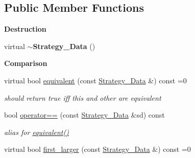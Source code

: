 \subsection*{Public Member Functions}
\begin{Indent}{\bf Destruction}\par
\begin{DoxyCompactItemize}
\item 
\hypertarget{class_strategy___data_a205c91d1a1daeb9cf9494d638c7ad04a}{}virtual {\bfseries $\sim$\+Strategy\+\_\+\+Data} ()\label{class_strategy___data_a205c91d1a1daeb9cf9494d638c7ad04a}

\end{DoxyCompactItemize}
\end{Indent}
\begin{Indent}{\bf Comparison}\par
\begin{DoxyCompactItemize}
\item 
\hypertarget{class_strategy___data_aa5c2a8e478379b335a47bd954d072b2f}{}virtual bool \hyperlink{class_strategy___data_aa5c2a8e478379b335a47bd954d072b2f}{equivalent} (const \hyperlink{class_strategy___data}{Strategy\+\_\+\+Data} \&) const  =0\label{class_strategy___data_aa5c2a8e478379b335a47bd954d072b2f}

\begin{DoxyCompactList}\small\item\em should return {\ttfamily true} iff {\ttfamily this} and other are equivalent \end{DoxyCompactList}\item 
\hypertarget{class_strategy___data_a3302c097b74709efb2237de9b2608eaa}{}bool \hyperlink{class_strategy___data_a3302c097b74709efb2237de9b2608eaa}{operator==} (const \hyperlink{class_strategy___data}{Strategy\+\_\+\+Data} \&sd) const \label{class_strategy___data_a3302c097b74709efb2237de9b2608eaa}

\begin{DoxyCompactList}\small\item\em alias for \hyperlink{class_strategy___data_aa5c2a8e478379b335a47bd954d072b2f}{equivalent()} \end{DoxyCompactList}\item 
\hypertarget{class_strategy___data_ad47f2b1b43b8730885577dadd98af591}{}virtual bool \hyperlink{class_strategy___data_ad47f2b1b43b8730885577dadd98af591}{first\+\_\+larger} (const \hyperlink{class_strategy___data}{Strategy\+\_\+\+Data} \&) const  =0\label{class_strategy___data_ad47f2b1b43b8730885577dadd98af591}


\end{DoxyCompactItemize}
\end{Indent}
